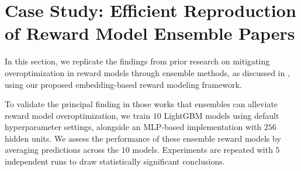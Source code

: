 \section{Case Study: Efficient Reproduction of Reward Model Ensemble Papers}
\label{sec:reproduce_demo}




In this section, we replicate the findings from prior research on mitigating overoptimization in reward models through ensemble methods, as discussed in \citep{coste2023reward, ahmed2024scalable}, using our proposed embedding-based reward modeling framework.


To validate the principal finding in those works that ensembles can alleviate reward model overoptimization, we train $10$ LightGBM models \citep{ke2017lightgbm} using default hyperparameter settings, alongside an MLP-based implementation with $256$ hidden units. We assess the performance of these ensemble reward models by averaging predictions across the $10$ models. Experiments are repeated with $5$ independent runs to draw statistically significant conclusions.

